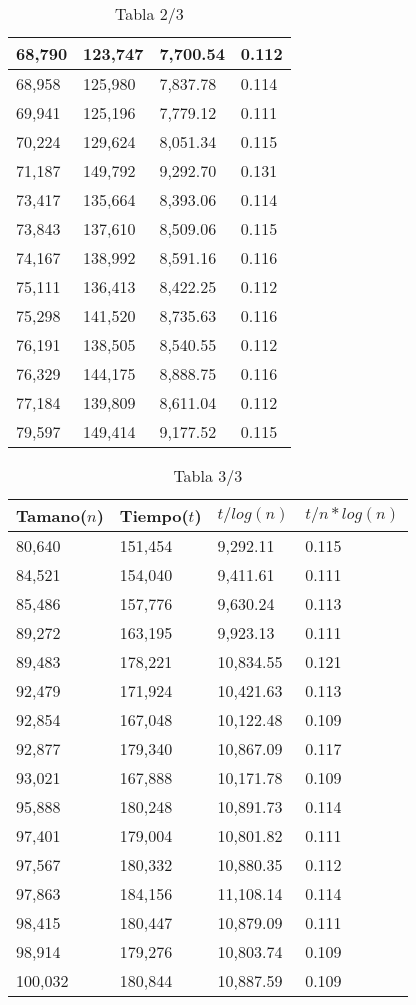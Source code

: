 \begin{table}[H]
{\begin{tabular}{| l | l | l |l |}
68,790	&	123,747	&	7,700.54	&	0.112	\\ \hline
68,958	&	125,980	&	7,837.78	&	0.114	\\ \hline
69,941	&	125,196	&	7,779.12	&	0.111	\\ \hline
70,224	&	129,624	&	8,051.34	&	0.115	\\ \hline
71,187	&	149,792	&	9,292.70	&	0.131	\\ \hline
73,417	&	135,664	&	8,393.06	&	0.114	\\ \hline
73,843	&	137,610	&	8,509.06	&	0.115	\\ \hline
74,167	&	138,992	&	8,591.16	&	0.116	\\ \hline
75,111	&	136,413	&	8,422.25	&	0.112	\\ \hline
75,298	&	141,520	&	8,735.63	&	0.116	\\ \hline
76,191	&	138,505	&	8,540.55	&	0.112	\\ \hline
76,329	&	144,175	&	8,888.75	&	0.116	\\ \hline
77,184	&	139,809	&	8,611.04	&	0.112	\\ \hline
79,597	&	149,414	&	9,177.52	&	0.115	\\ \hline


  \end{tabular}
   \caption*{Tabla 2/3}
}
\end{table}
\begin{table}[H]
\parbox{0.3\textwidth}{
  \begin{tabular}{| l | l | l |l |}
    \hline
    Tamano($n$) & Tiempo($t$) & $t / log(n)$ & $t / n*log(n)$ \\ \hline
80,640	&	151,454	&	9,292.11	&	0.115	\\ \hline
84,521	&	154,040	&	9,411.61	&	0.111	\\ \hline
85,486	&	157,776	&	9,630.24	&	0.113	\\ \hline
89,272	&	163,195	&	9,923.13	&	0.111	\\ \hline
89,483	&	178,221	&	10,834.55	&	0.121	\\ \hline
92,479	&	171,924	&	10,421.63	&	0.113	\\ \hline
92,854	&	167,048	&	10,122.48	&	0.109	\\ \hline
92,877	&	179,340	&	10,867.09	&	0.117	\\ \hline
93,021	&	167,888	&	10,171.78	&	0.109	\\ \hline
95,888	&	180,248	&	10,891.73	&	0.114	\\ \hline
97,401	&	179,004	&	10,801.82	&	0.111	\\ \hline
97,567	&	180,332	&	10,880.35	&	0.112	\\ \hline
97,863	&	184,156	&	11,108.14	&	0.114	\\ \hline
98,415	&	180,447	&	10,879.09	&	0.111	\\ \hline
98,914	&	179,276	&	10,803.74	&	0.109	\\ \hline
100,032	&	180,844	&	10,887.59	&	0.109	\\ \hline

  \end{tabular}
   \caption*{Tabla 3/3}
}
\end{table}


